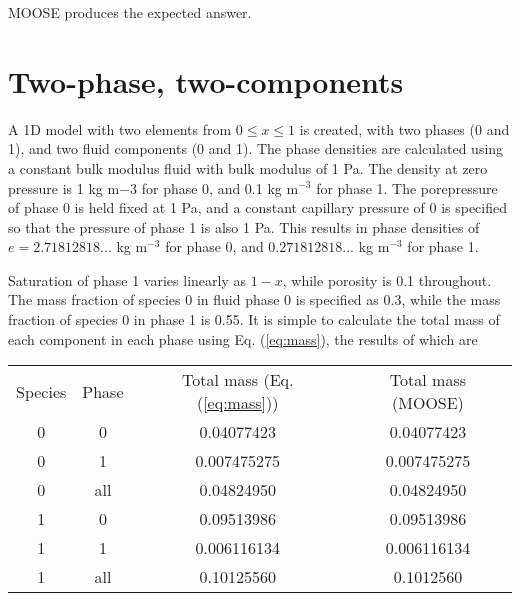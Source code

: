 \documentclass[]{scrreprt}
\begin{document}
MOOSE produces the expected answer.

\section{Two-phase, two-components}

A 1D model with two elements from $0 \leq x \leq 1$ is created, with two phases (0 and 1), and two fluid components (0 and 1). The phase densities are calculated using a constant bulk modulus fluid with bulk modulus of 1 Pa. The density at zero pressure is 1 kg m${-3}$ for phase 0, and 0.1 kg m$^{-3}$ for phase 1. The porepressure of phase 0 is held fixed at 1 Pa, and a constant capillary pressure of 0 is specified so that the pressure of phase 1 is also 1 Pa. This results in phase densities of $e = 2.71812818...$ kg m$^{-3}$ for phase 0, and $0.271812818...$ kg m$^{-3}$ for phase 1.

Saturation of phase 1 varies linearly as $1 - x$, while porosity is 0.1 throughout. The mass fraction of species 0 in fluid phase 0 is specified as 0.3, while the mass fraction of species 0 in phase 1 is 0.55. It is simple to calculate the total mass of each component in each phase using Eq. (\ref{eq:mass}), the results of which are

\begin{center}
\begin{tabular}{|cccc|}
\hline
Species & Phase & Total mass (Eq. (\ref{eq:mass})) & Total mass (MOOSE) \\
0 & 0 & 0.04077423 & 0.04077423 \\
0 & 1 & 0.007475275 & 0.007475275 \\
0 & all & 0.04824950 &  0.04824950\\
1 & 0 & 0.09513986 & 0.09513986\\
1 & 1 & 0.006116134 & 0.006116134\\
1 & all & 0.10125560 & 0.1012560\\
\hline
\end{tabular}
\end{center}
\end{document}

